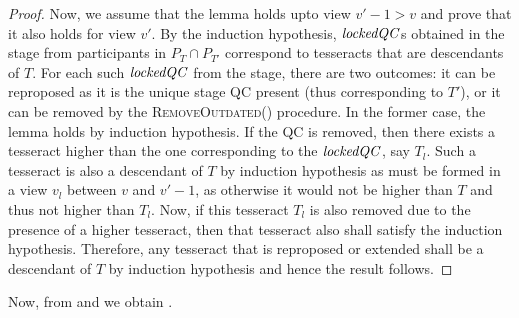 \begin{proof}
Now, we assume that the lemma holds upto view $v'-1>v$ and prove that it also holds for view $v'$. 
By the induction hypothesis, $\mathit{lockedQC}$s obtained in the  stage from participants in $P_T\cap P_{T'}$ correspond to tesseracts that are descendants of $T$. 
For each such $\mathit{lockedQC}$ from the  stage, there are two outcomes: it can be reproposed as it is the unique  stage QC present (thus corresponding to $T'$), or it can be removed by the \textsc{RemoveOutdated}() procedure. 
In the former case, the lemma holds by induction hypothesis.
If the QC is removed, then there exists a tesseract higher than the one corresponding to the $\mathit{lockedQC}$, say $T_l$. 
Such a tesseract is also a descendant of $T$ by induction hypothesis as must be formed in a view $v_l$ between $v$ and $v'-1$, as otherwise it would not be higher than $T$ and thus not higher than $T_l$. 
Now, if this tesseract $T_l$ is also removed due to the presence of a higher tesseract, then that tesseract also shall satisfy the induction hypothesis. Therefore, any tesseract that is reproposed or extended shall be a descendant of $T$ by induction hypothesis and hence the result follows.
\end{proof}

Now, from  and   we obtain . 

